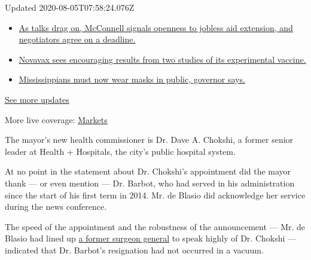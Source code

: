 Updated 2020-08-05T07:58:24.076Z

\begin{itemize}
\tightlist
\item
  \href{https://www.nytimes3xbfgragh.onion/2020/08/04/world/coronavirus-cases.html?action=click\&pgtype=Article\&state=default\&region=MAIN_CONTENT_1\&context=storylines_live_updates\#link-762df92}{As
  talks drag on, McConnell signals openness to jobless aid extension,
  and negotiators agree on a deadline.}
\item
  \href{https://www.nytimes3xbfgragh.onion/2020/08/04/world/coronavirus-cases.html?action=click\&pgtype=Article\&state=default\&region=MAIN_CONTENT_1\&context=storylines_live_updates\#link-1228a480}{Novavax
  sees encouraging results from two studies of its experimental
  vaccine.}
\item
  \href{https://www.nytimes3xbfgragh.onion/2020/08/04/world/coronavirus-cases.html?action=click\&pgtype=Article\&state=default\&region=MAIN_CONTENT_1\&context=storylines_live_updates\#link-794484ed}{Mississippians
  must now wear masks in public, governor says.}
\end{itemize}

\href{https://www.nytimes3xbfgragh.onion/2020/08/04/world/coronavirus-cases.html?action=click\&pgtype=Article\&state=default\&region=MAIN_CONTENT_1\&context=storylines_live_updates}{See
more updates}

More live coverage:
\href{https://www.nytimes3xbfgragh.onion/live/2020/08/04/business/stock-market-today-coronavirus?action=click\&pgtype=Article\&state=default\&region=MAIN_CONTENT_1\&context=storylines_live_updates}{Markets}

The mayor's new health commissioner is Dr. Dave A. Chokshi, a former
senior leader at Health + Hospitals, the city's public hospital system.

At no point in the statement about Dr. Chokshi's appointment did the
mayor thank --- or even mention --- Dr. Barbot, who had served in his
administration since the start of his first term in 2014. Mr. de Blasio
did acknowledge her service during the news conference.

The speed of the appointment and the robustness of the announcement ---
Mr. de Blasio had lined up
\href{https://wayback.archive-it.org/4765/20170106172109/https:/www.hhs.gov/about/leadership/vadm-vivek-murthy/index.html}{a
former surgeon general} to speak highly of Dr. Chokshi --- indicated
that Dr. Barbot's resignation had not occurred in a vacuum.

